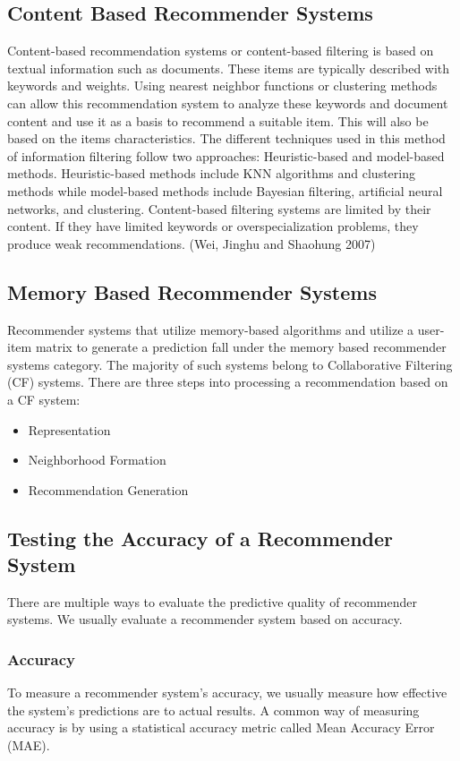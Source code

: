 \subsection{Content Based Recommender Systems}
Content-based recommendation systems or content-based filtering is based on textual information such as documents. These items are typically described with keywords and weights. Using nearest neighbor functions or clustering methods can allow this recommendation system to analyze these keywords and document content and use it as a basis to recommend a suitable item. This will also be based on the items characteristics. The different techniques used in this method of information filtering follow two approaches: Heuristic-based and model-based methods. Heuristic-based methods include KNN algorithms and clustering methods while model-based methods include Bayesian filtering, artificial neural networks, and clustering. Content-based filtering systems are limited by their content. If they have limited keywords or overspecialization problems, they produce weak recommendations. (Wei, Jinghu and Shaohung 2007)

\subsection{Memory Based Recommender Systems}
Recommender systems that utilize memory-based algorithms and utilize a user-item matrix to generate a prediction fall under the memory based recommender systems category. The majority of such systems belong to Collaborative Filtering (CF) systems. There are three steps into processing a recommendation based on a CF system:
\begin{itemize}
\item Representation
\item Neighborhood Formation
\item Recommendation Generation
\end{itemize}

\subsection{Testing the Accuracy of a Recommender System}
There are multiple ways to evaluate the predictive quality of recommender systems. We usually evaluate a recommender system based on accuracy.
\subsubsection{Accuracy}
To measure a recommender system’s accuracy, we usually measure how effective the system’s predictions are to actual results. A common way of measuring accuracy is by using a statistical accuracy metric called Mean Accuracy Error (MAE).
